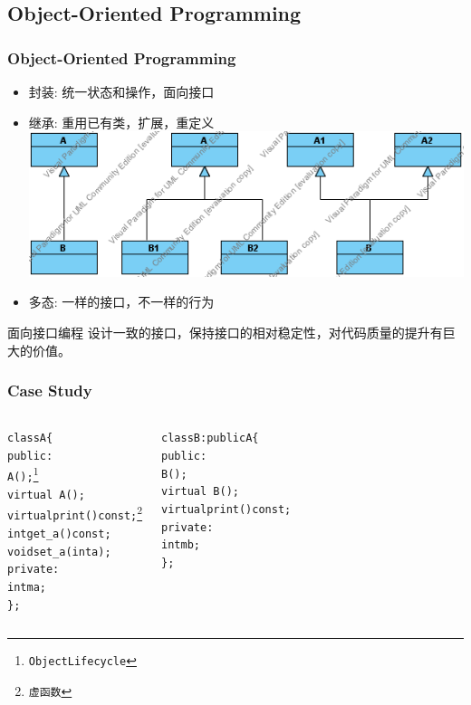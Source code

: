 \subsection{Object-Oriented Programming}
\begin{frame}
  \frametitle{Object-Oriented Programming}
  \begin{itemize}
    \item 封装: 统一状态和操作，面向接口
    \item 继承: 重用已有类，扩展，重定义\\
      {\centering\includegraphics[scale=0.4]{images/class.png}}
    \item 多态: 一样的接口，不一样的行为
  \end{itemize}
  \begin{block}{面向接口编程}
    设计一致的接口，保持接口的相对稳定性，对代码质量的提升有巨大的价值。
  \end{block}
\end{frame}

\begin{frame}[containsverbatim]
  \frametitle{Case Study}
  \begin{columns}[t]
    \begin{alltt}
    class A \{
    public:
      \alert{A();}\footnote{Object Lifecycle}
      \alert{virtual ~A();}
      \alert{virtual print() const;}\footnote{虚函数}
      int get_a() const;
      void set_a(int a);
    private:
      int ma;
    \};
    \end{alltt}
    \begin{alltt}
    class B : \alert{public A} \{
    public:
      \alert{B();}
      \alert{virtual ~B();}
      \alert{virtual print() const;}
    private:
      int mb;
    \};
    \end{alltt}
  \end{columns}
\end{frame}

